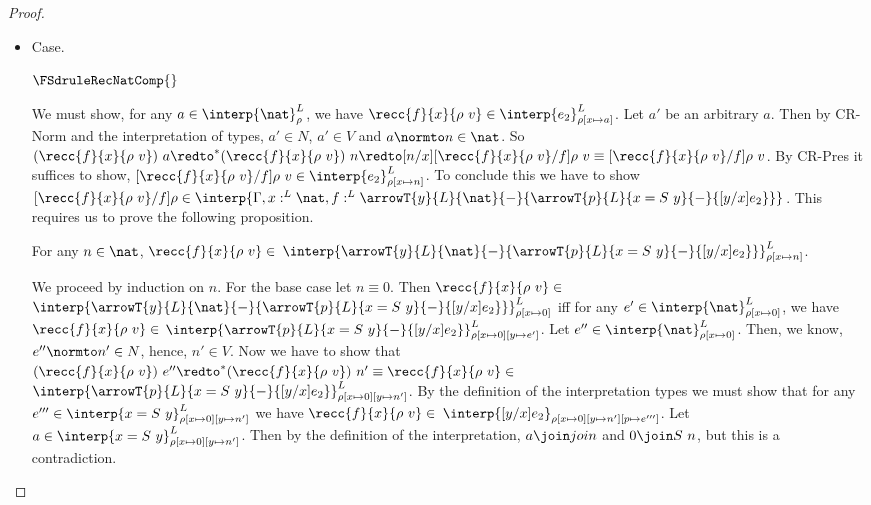 \begin{proof}
\begin{itemize}
  By Proposition~\ref{prop:rec_interp_proof}, $\rec{f}{x}{\rho\ v}
  \in $ $\interp{\arrowT{y}{L}{\nat}{+}{\arrowT{p}{L}{x =
  S\ y}{-}{[y/x]e_2}}}^L_{\rho[x \mapsto n]}$.  Thus,
  $[n/x][\rec{f}{x}{\rho\ v}/f]\rho \in $ $\interp{\Gamma,x:^L
  \nat,f:^L \arrowT{y}{L}{\nat}{+}{\arrowT{p}{L}{x =
  S\ y}{-}{[y/x]e_2}}}$ and we can finally conclude,
  $[n/x][\rec{f}{x}{\rho\ v}/f]\rho\ v \in $
  $\interp{e_2}^L_{\rho[x \mapsto n]}$.  By
  CR-Pres, $(\rec{f}{x}{\rho\ v})\ e \in $ $\interp{e_2}^L_{\rho[x \mapsto n]}$.  
  Therefore, $\rec{f}{x}{\rho\ v} \in \interp{\arrowT{x}{L}{\nat}{+}{e_2}}^L_\rho$.

\item[]Case.\ \\
  \begin{center}
    $\FSdruleRecNatComp{}$
  \end{center}
  We must show, for any $a \in \interp{\nat}^L_{\rho}$, we have $\recc{f}{x}{\rho\ v} \in
  \interp{e_2}^L_{\rho[x \mapsto a]}$.  Let $a'$ be an arbitrary $a$.  Then by CR-Norm and the 
  interpretation of types, $a' \in N$, $a' \in V$
  and $a \normto n \in \nat$.  So $(\recc{f}{x}{\rho\ v})\ a \redto^* 
  (\recc{f}{x}{\rho\ v})\ n \redto [n/x][\recc{f}{x}{\rho\ v}/f]\rho\ v \equiv
  [\recc{f}{x}{\rho\ v}/f]\rho\ v$.  By CR-Pres it suffices to show, 
  $[\recc{f}{x}{\rho\ v}/f]\rho\ v \in \interp{e_2}^L_{\rho[x \mapsto n]}$.  To conclude this
  we have to show $[\recc{f}{x}{\rho\ v}/f]\rho \in \interp{\Gamma,x:^L \nat, f:^L 
  \arrowT{y}{L}{\nat}{-}{\arrowT{p}{L}{x = S\ y}{-}{[y/x]e_2}}}$.  This requires us to prove the 
  following proposition.

  \noindent
  
  \begin{proposition}
    \label{prop:recc_interp_proof}
    For any $n \in \nat$, $\recc{f}{x}{\rho\ v} \in $
    $\interp{\arrowT{y}{L}{\nat}{-}{\arrowT{p}{L}{x=S\ y}{-}{[y/x]e_2}}}^L_{\rho[x \mapsto n]}$.
  \end{proposition}
  
  \noindent
  We proceed by induction on $n$.  For the base case let $n \equiv 0$.
  Then $\recc{f}{x}{\rho\ v} \in $
  $\interp{\arrowT{y}{L}{\nat}{-}{\arrowT{p}{L}{x =
  S\ y}{-}{[y/x]e_2}}}^L_{\rho[x \mapsto 0]}$ iff for any $e'
  \in \interp{\nat}^L_{\rho[x \mapsto 0]}$, we have
  $\recc{f}{x}{\rho\ v} \in $ $\interp{\arrowT{p}{L}{x =
  S\ y}{-}{[y/x]e_2}}^L_{\rho[x \mapsto 0][y \mapsto e']}$.
  Let 
  $e'' \in \interp{\nat}^L_{\rho[x \mapsto 0]}$. Then, we know, 
  $e'' \normto n' \in N$, hence, $n' \in V$.  
  Now we have to show that $(\recc{f}{x}{\rho\ v})\ e'' \redto^*
  (\recc{f}{x}{\rho\ v})\ n' \equiv \recc{f}{x}{\rho\ v}
  \in $ $\interp{\arrowT{p}{L}{x =
  S\ y}{-}{[y/x]e_2}}^L_{\rho[x \mapsto 0][y \mapsto n']}$.  By
  the definition of the interpretation types we must show that for any
  $e''' \in \interp{x = S\ y}^L_{\rho[x \mapsto 0][y \mapsto n']}$ we
  have $\recc{f}{x}{\rho\ v} \in $ $\interp{[y/x]e_2}_{\rho[x
  \mapsto 0][y \mapsto n'][p \mapsto e''']}$.  Let 
  $a \in \interp{x = S\ y}^L_{\rho[x \mapsto 0][y \mapsto n']}$.  
  Then by the definition of the interpretation, $a \join join$ and $0
  \join S\ n$, but this is a contradiction.


\end{itemize}
\end{proof}
